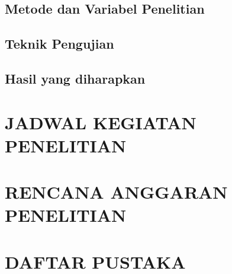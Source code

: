 \documentclass[12pt,a4paper]{report}
\begin{document}
\section{Metode dan Variabel Penelitian}
\section{Teknik Pengujian}
\section{Hasil yang diharapkan}

\chapter*{JADWAL KEGIATAN PENELITIAN}



\chapter*{RENCANA ANGGARAN PENELITIAN}



\chapter*{DAFTAR PUSTAKA}
\end{document}
